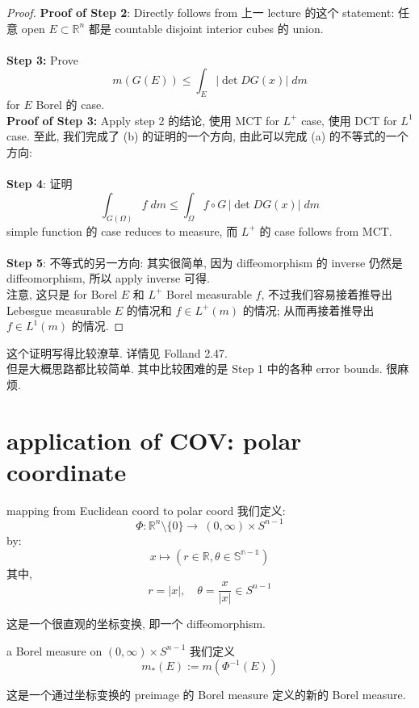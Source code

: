 \documentclass[lang=cn,11pt]{elegantbook}
\begin{document}
\begin{proof}
\textbf{Proof of Step 2}: Directly follows from 上一 lecture 的这个 statement: 任意 open $E \subset\mathbb{R}^n$ 都是 countable disjoint interior cubes 的 union.\\\\
\textbf{Step 3:} Prove \[m(G(E)) \leq \int_E |\det DG(x)| \; dm\] for $E$ Borel 的 case.\\
\textbf{Proof of Step 3:} Apply step 2 的结论, 使用 MCT for $L^+$ case, 使用 DCT for $L^1$ case.
至此, 我们完成了 (b) 的证明的一个方向, 由此可以完成 (a) 的不等式的一个方向:\\\\
\textbf{Step 4}: 证明 \[
\int _{G(\Omega)} f\; dm \leq \int_{\Omega  }f\circ G \,|\det DG(x)| \; dm
\]
simple function 的 case reduces to measure, 而 $L^+$ 的 case follows from MCT.\\\\
\textbf{Step 5}: 不等式的另一方向: 其实很简单, 因为 diffeomorphism 的 inverse 仍然是 diffeomorphism, 所以 apply inverse 可得.\\
注意, 这只是 for Borel $E$ 和 $L^+$ Borel measurable $f$, 不过我们容易接着推导出 Lebesgue measurable $E$ 的情况和 $f \in L^+(m)$ 的情况; 从而再接着推导出  $f\in L^1(m)$ 的情况.
\end{proof}
\begin{remark}
这个证明写得比较潦草. 详情见 Folland 2.47.\\
但是大概思路都比较简单. 其中比较困难的是 Step 1 中的各种 error bounds. 很麻烦.\\
\end{remark}


\section{application of COV: polar coordinate}
\begin{definition}{mapping from Euclidean coord to polar coord}
 我们定义: \[
\Phi: \mathbb{R}^n \setminus \{0\}  \rightarrow \ (0,\infty) \times S^{n-1}
\]by: \[
x \mapsto (r\in \mathbb{R},\theta \in\mathbb{S^{n-1}})
\]
其中, \[
r = |x| ,\quad \theta =  \frac{x}{|x|} \in S^{n-1}
\]
   
\end{definition}
这是一个很直观的坐标变换, 即一个 diffeomorphism.\\

\begin{definition}{a Borel measure on $(0,\infty) \times S^{n-1}$}
    我们定义 \[
    m_*(E) := m(\Phi^{-1}(E))
    \]
\end{definition}
这是一个通过坐标变换的 preimage 的 Borel measure 定义的新的 Borel measure.\\
\end{document}
